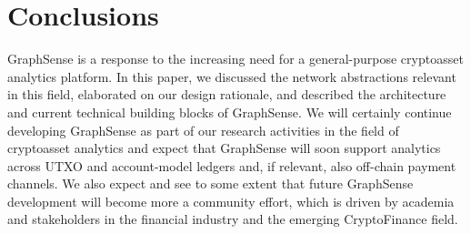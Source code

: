 
\section{Conclusions}
\label{sec:conclusions}

GraphSense is a response to the increasing need for a general-purpose cryptoasset analytics platform. In this paper, we discussed the network abstractions relevant in this field, elaborated on our design rationale, and described the architecture and current technical building blocks of GraphSense.
We will certainly continue developing GraphSense as part of our research activities in the field of cryptoasset analytics and expect that GraphSense will soon support analytics across UTXO and account-model ledgers and, if relevant, also off-chain payment channels. We also expect and see to some extent that future GraphSense development will become more a community effort, which is driven by academia and stakeholders in the financial industry and the emerging CryptoFinance field.